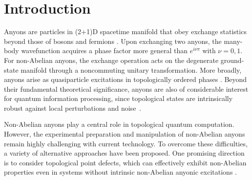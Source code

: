 \documentclass[a4paper,11pt]{article}
\theoremstyle{definition}
\theoremstyle{remark}
\begin{document}
\maketitle




\section{Introduction}
\label{sec:intro}
Anyons are particles in (2+1)D spacetime manifold that obey exchange statistics beyond those of bosons and fermions \cite{Leinaas1977anyon}. Upon exchanging two anyons, the many-body wavefunction acquires a phase factor more general than $e^{i\nu\pi}$ with $\nu=0,1$. For non-Abelian anyons, the exchange operation acts on the degenerate ground-state manifold through a noncommuting unitary transformation.
More broadly, anyons arise as quasiparticle excitations in topologically ordered phases \cite{Wen2004,simon2023topoligical}.
Beyond their fundamental theoretical significance, anyons are also of considerable interest for quantum information processing, since topological states are intrinsically robust against local perturbations and noise~\cite{Kitaev2003,wang2010topological,Nayak2008}.

Non-Abelian anyons play a central role in topological quantum computation. However, the experimental preparation and manipulation of non-Abelian anyons remain highly challenging with current technology.
To overcome these difficulties, a variety of alternative approaches have been proposed. One promising direction is to consider topological point defects, which can effectively exhibit non-Abelian properties even in systems without intrinsic non-Abelian anyonic excitations \cite{Bombin2010,Cheng2012defect,Sarma2015defect,cong2017defects,Kitaev2012boundary}.
\end{document}
